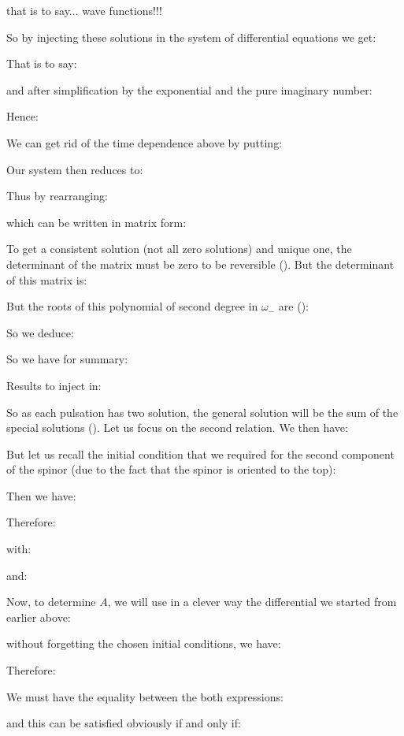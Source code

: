 	that is to say... wave functions!!!
	
	So by injecting these solutions in the system of differential equations we get:
	
	That is to say:
	
	and after simplification by the exponential and the pure imaginary number:
	
	Hence:
	
	We can get rid of the time dependence above by putting:
	
	Our system then reduces to:
	
	Thus by rearranging:
	
	which can be written in matrix form:
	
	To get a consistent solution (not all zero solutions) and unique one, the determinant of the matrix must be zero to be reversible (). But the determinant of this matrix is:
	
	But the roots of this polynomial of second degree in $\omega_{-}$ are ():
	
	So we deduce:
	
	So we have for summary:
	
	Results to inject in:
	
	So as each pulsation has two solution, the general solution will be the sum of the special solutions (). Let us focus on the second relation. We then have:
	
	But let us recall the initial condition that we required for the second component of the spinor (due to the fact that the spinor is oriented to the top):
	
	Then we have:
	
	Therefore:
	
	with:
	
	and:
	
	Now, to determine $A$, we will use in a clever way the differential we started from earlier above:
	
	without forgetting the chosen initial conditions, we have:
	
	Therefore:
	
	We must have the equality between the both expressions:
	
	and this can be satisfied obviously if and only if:
	
